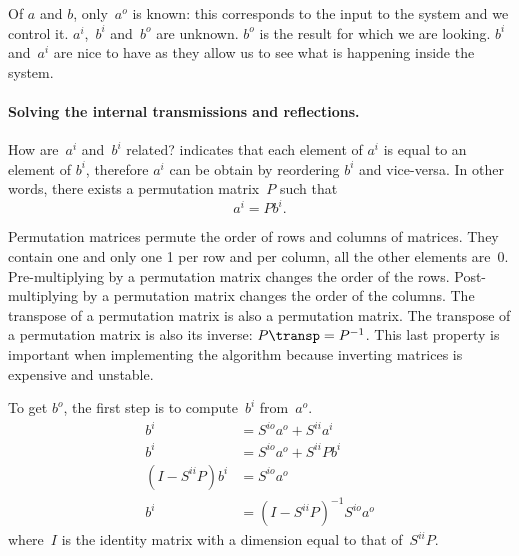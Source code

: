 Of $a$ and $b$, only~$a^o$ is known: this corresponds to the input to the system and we control it.
$a^i$,~$b^i$ and~$b^o$ are unknown.
$b^o$ is the result for which we are looking.
$b^i$ and~$a^i$ are nice to have as they allow us to see what is happening inside the system.

\paragraph{Solving the internal transmissions and reflections.}
How are~$a^i$ and~$b^i$ related?
 indicates that each element of $a^i$ is equal to an element of $b^i$, therefore $a^i$ can be obtain by reordering $b^i$ and vice-versa.
In other words, there exists a permutation matrix~$P$ such that
\begin{equation}
    a^i = P b^i \text{.} \label{eq:relation_ai_bi}
\end{equation}

Permutation matrices permute the order of rows and columns of matrices.
They contain one and only one 1 per row and per column, all the other elements are~0.
Pre-multiplying by a permutation matrix changes the order of the rows.
Post-multiplying by a permutation matrix changes the order of the columns.
The transpose of a permutation matrix is also a permutation matrix.
The transpose of a permutation matrix is also its inverse: $P\transp = P^{-1}$.
This last property is important when implementing the algorithm because inverting matrices is expensive and unstable.

To get $b^o$, the first step is to compute~$b^i$ from~$a^o$.
\begin{subequations}
    \begin{align}
        b^i &= S^{io}a^o + S^{ii}a^i \label{eq:compute_bi_ai} \\
        b^i &= S^{io}a^o + S^{ii}Pb^i \label{eq:compute_bi_bi} \\
        (I - S^{ii}P)b^i &= S^{io}a^o \label{eq:compute_bi_solve} \\
        b^i &= (I - S^{ii}P)^{-1} S^{io}a^o \label{eq:compute_bi_invert}
    \end{align} \label{eq:compute_bi}
\end{subequations}
where~$I$ is the identity matrix with a dimension equal to that of~$S^{ii}P$.

